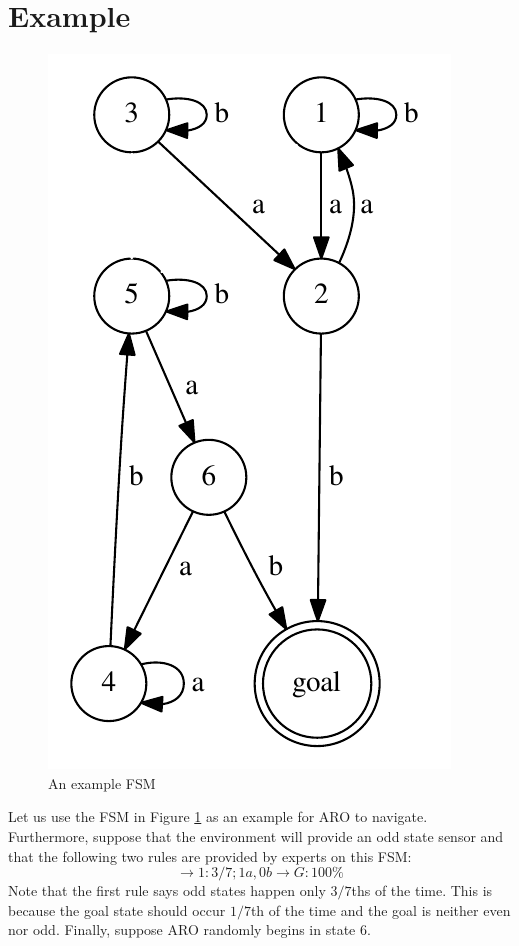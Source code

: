 \documentclass[letterpaper]{article} %
\begin{document}
\section{Example}

\begin{figure}
	\centering
	\includegraphics[width=0.6\columnwidth]{ExampleFSM} %
	\caption{An example FSM}
	\label{fig1}
\end{figure}



Let us use the FSM in Figure \ref{fig1} as an example for ARO to navigate. Furthermore, suppose that the environment will provide an odd state sensor and that the following two rules are provided by experts on this FSM: $$ \rightarrow 1: 3/7; 1a, 0b \rightarrow G: 100\%$$
Note that the first rule says odd states happen only $3/7$ths of the time. This is because the goal state should occur $1/7$th of the time and the goal is neither even nor odd. Finally, suppose ARO randomly begins in state $6$.
\end{document}
